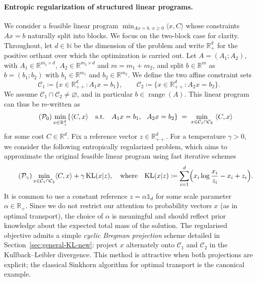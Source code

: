 \documentclass{article}
\newcommand{\dotp}[2]{\langle #1,#2 \rangle}
\theoremstyle{plain}
\newcommand{\mc}[1]{\mathcal{#1}}
\newcommand{\ones}{\mathds{1}}
\newcommand{\eqdef}{\coloneqq}
\newcommand{\RR}{\mathbb{R}}
\newcommand{\Cc}{\mathcal{C}}
\newcommand{\range}{\operatorname{range}}
\newcommand{\z}{z}
\newcommand{\KLdiv}[2]{\mathrm{KL}(#1|#2)}
\begin{document}
\paragraph{Entropic regularization of structured linear programs.}
We consider a feasible linear program $\min_{Ax=b,\,x\ge0}\dotp{x}{C}$ whose constraints $Ax=b$ naturally split into blocks.
%
We focus on the two-block case for clarity.
%
Throughout, let $d \in\mathbb{N}$ be the dimension of the problem and write $\RR^d_{+}$ for the positive orthant over which the optimization is carried out. Let $A=(A_1;A_2)$, with $A_1\in\RR^{m_1\times d}$, $A_2\in\RR^{m_2\times d}$ and $m=m_1+m_2$, and split $b\in\RR^m$ as $b=(b_1;b_2)$ with $b_1\in\RR^{m_1}$ and $b_2\in\RR^{m_2}$.
We define the two affine constraint sets
\[
  \Cc_{1}\eqdef\{x\in\RR^{d}_{++}: A_{1}x=b_{1}\},
  \qquad
  \Cc_{2}\eqdef\{x\in\RR^{d}_{++}: A_{2}x=b_{2}\}.
\]
We assume $\Cc_{1}\cap\Cc_{2}\neq\varnothing$, and in particular $b \in \range(A)$.
%
This linear program can thus be re-written as
\begin{equation}
	\label{eq:linprog}
	\tag{$\mc P_{0}$}
  \min_{x\in\RR^{d}_{+}} \{ \dotp{C}{x}
  \quad\text{s.t.}\quad
  A_{1}x=b_{1},\ \ A_{2}x=b_{2} \}
  \;=\;
  \min_{x\in\Cc_{1}\cap\Cc_{2}} \ \dotp{C}{x}
\end{equation}
for some cost $C \in \RR^d$.
%
Fix a reference vector $\z\in\RR^{d}_{++}$.
For a temperature $\gamma>0$, we consider the following entropically regularized problem, which aims to approximate the original feasible linear program using fast iterative schemes
\begin{equation}
	\label{eq:entropic-penalized}
	\tag{$\mc P_{\gamma}$}
	\min_{x\in\Cc_{1}\cap\Cc_{2}}
	      \dotp{C}{x}+\gamma\,\KLdiv{x}{\z}, \quad\text{where}\quad
	      \KLdiv{x}{\z} \eqdef \sum_{i=1}^{d}\Bigl(x_{i}\log\frac{x_{i}}{\z_{i}}-x_{i}+\z_{i}\Bigr).
\end{equation}
It is common to use a constant reference $z=\alpha \ones_d$ for some scale parameter $\alpha \in \RR_+$. Since we do not restrict our attention to probability vectors $x$ (as in optimal transport), the choice of $\alpha$ is meaningful and should reflect prior knowledge about the expected total mass of the solution.
%
The regularised objective admits a simple \emph{cyclic Bregman projection} scheme detailed in Section~\ref{sec:general-KL-new}: project $x$ alternately onto $\Cc_{1}$ and $\Cc_{2}$ in the Kullback--Leibler divergence.
This method is attractive when both projections are explicit; the classical Sinkhorn algorithm for optimal transport is the canonical example.
\end{document}
